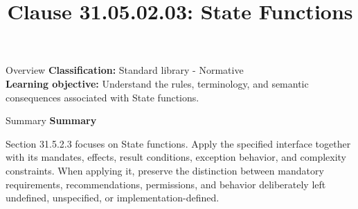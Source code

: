 \documentclass[10pt,letterpaper]{article}
\title{Clause 31.05.02.03: State Functions}
\author{}
\date{}
\begin{document}
\maketitle
\begin{CornellOverviewBox}{Overview}
\textbf{Classification:} Standard library - Normative\\[2pt]
\textbf{Learning objective:} Understand the rules, terminology, and semantic consequences associated with State functions.
\end{CornellOverviewBox}\begin{CornellSummaryBox}{Summary}
{\sffamily\bfseries\color{Accent} Summary}\par\vspace{3pt}Section 31.5.2.3 focuses on State functions. Apply the specified interface together with its mandates, effects, result conditions, exception behavior, and complexity constraints. When applying it, preserve the distinction between mandatory requirements, recommendations, permissions, and behavior deliberately left undefined, unspecified, or implementation-defined.
\end{CornellSummaryBox}
\end{document}
